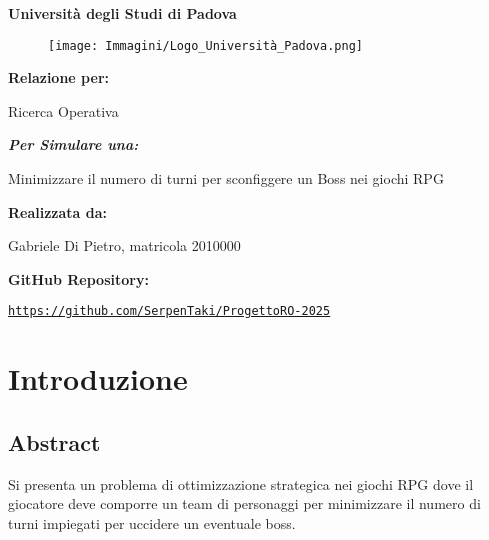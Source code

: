 \documentclass[12pt]{article}
\renewcommand{\familydefault}{\rmdefault} %
\begin{document}
\begin{titlepage}
    \centering
    {\Huge \textbf{Università degli Studi di Padova} \par}
    \vspace{1cm}
    \begin{figure}[h!]
        \centering
        \texttt{[image: Immagini/Logo\_Università\_Padova.png]}
    \end{figure}
    \vspace{0.5cm}
    {\LARGE \textbf{Relazione per:} \par}
    {\Huge Ricerca Operativa \par}
    \vspace{0.5cm}
    {\Large \textit{\textbf{Per Simulare una:}} \par}
    {\Large Minimizzare il numero di turni per sconfiggere un Boss nei giochi RPG \par}
    \vfill
    \textbf{Realizzata da:} \par
    Gabriele Di Pietro, matricola 2010000 \par
    \vspace{0.5cm}
    \textbf{GitHub Repository:} \par
    \texttt{\url{https://github.com/SerpenTaki/ProgettoRO-2025}}
\end{titlepage}
    \renewcommand{\familydefault}{\sfdefault} %
    \fontsize{10}{12}\selectfont
    \newpage
    \tableofcontents
    \newpage
    \section{Introduzione}
    \subsection{Abstract}
    Si presenta un problema di ottimizzazione strategica nei giochi RPG dove il giocatore deve comporre un team di personaggi per minimizzare il numero di turni impiegati per uccidere un eventuale boss.
\end{document}
